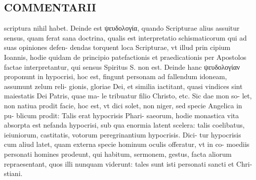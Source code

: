 \documentclass{article}
\begin{document}
\begin{pages}
\section*{COMMENTARII }\pstart scriptura nihil habet. Deinde est ψευδολογία, quando Scripturae alius assuitur sensus, quam ferat sana doctrina, qualis est interpretatio schismaticorum qui ad suas opiniones defen- dendas torquent loca Scripturae, vt illud prin cipium Ioannis, hodie quidam de principio patefactionis et praedicationis per Apostolos factae interpretantur, qui sensus Spiritus S. non est. Deinde hanc ψευδολογίαν proponunt in hypocrisi, hoc est, fingunt personam ad fallendum idoneam, assumunt zelum reli- gionis, gloriae Dei, et similia iactitant, quasi vindices sint maiestatis Dei Patris, quae ma- le tribuatur filio Christo, etc. Sic dae mon so- let, non natiua prodit facie, hoc est, vt dici solet, non niger, sed specie Angelica in pu- blicum prodit: Talis erat hypocrisis Phari- saeorum, hodie monastica vita absorpta est nefanda hypocrisi, sub qua enormia latent scelera: talis coelibatus, ieiuniorum, castitatis, votorum peregrinantium hypocrisis. Dici- tur hypocrisis cum aliud latet, quam externa specie hominum oculis offeratur, vt in co- moediis personati homines prodeunt, qui habitum, sermonem, gestus, facta aliorum repraesentant, quos illi nunquam viderunt: tales sunt isti personati sancti et Chri- stiani.  \pend

\end{pages}
\end{document}
